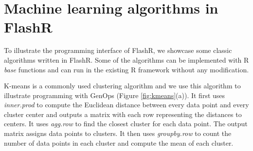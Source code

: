 \section{Machine learning algorithms in FlashR} \label{sec:apps}
To illustrate the programming interface of FlashR, we showcase some classic
algorithms written in FlashR.
Some of the algorithms can be implemented with R \textit{base} functions and
can run in the existing R framework without any modification.

K-means is a commonly used clustering algorithm and we use this algorithm
to illustrate programming with GenOps (Figure \ref{fig:kmeans}(a)).
It first uses \textit{inner.prod} to
compute the Euclidean distance between every data point and every cluster center
and outputs a matrix with each row representing the distances to centers.  
It uses \textit{agg.row} to find the closest
cluster for each data point.  The output matrix 
assigns data points to clusters. It then uses \textit{groupby.row} to count
the number of data points in each cluster and compute the mean of each cluster.


